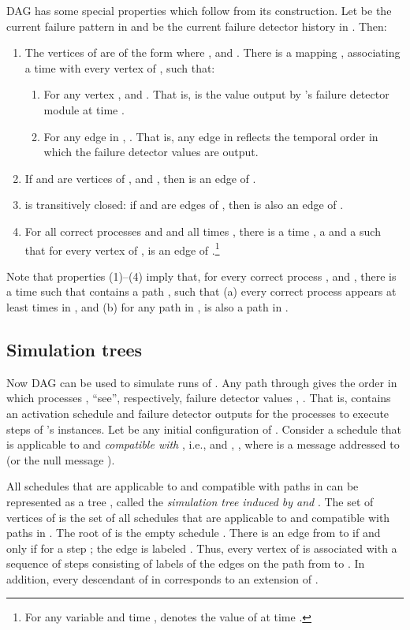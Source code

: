 \documentclass[11pt]{article}
\def\fd{failure detector}
\begin{document}
DAG  has some special properties which follow from its construction.
Let  be the current failure pattern in  and 
	be the current {\fd} history in .
Then: \begin{enumerate}
\item[(1)]  The vertices of  are of the form  where ,
 and .
There is a mapping ,
associating a time with every vertex of ,
such that:
\begin{enumerate}
\item[(a)] For any vertex ,  and .
That is,  is the value output by 's {\fd} module at time .

\item[(b)] For any edge  in , .
That is, any edge in  reflects the temporal order
	in which the {\fd} values are output.
\end{enumerate}
\item[(2)] If  and  are vertices of , and , then
 is an edge of .
\item[(3)]  is transitively closed: if  and  are edges of ,
	then  is also an edge of .
\item[(4)] For all correct processes  and  and all times ,
	there is a time , a  and a
	 such that for every  vertex  of ,
	 is an edge of .\footnote{
	For any variable  and time ,  denotes
	the value of  at time .}
\end{enumerate}


Note that properties (1)--(4) imply that, for every correct process ,  and ,
	there is a time  such that  contains a path
	, such that
	(a) every correct process appears at least  times in ,
	and (b) for any path  in ,  is also a path in .



\subsection{Simulation trees}
\label{subsec:cht:simulation}


Now DAG  can be used to simulate runs of .
Any path   
	through  gives the order in which
	processes ,   ``see'', respectively,
	{\fd} values ,  .
That is,  contains an activation schedule and {\fd}
	outputs for the processes to execute steps of
	's instances.
Let  be any initial configuration of .
Consider a schedule  that is applicable to 
	and \emph{compatible with },
	i.e.,  and , , where
	 is a message addressed to  (or the null message ).

All schedules that are applicable to  and compatible with paths in 
	can be represented as a tree , called the
	\emph{simulation tree induced by  and }.
The set of vertices of  is the set of all schedules  that are applicable to 
	and compatible with paths in .
The root of  is the empty schedule .
There is an edge from  to  if and only if  for a step ;
	the edge is labeled .
Thus, every vertex  of  is associated with a sequence
	of steps  consisting of labels of the edges
	on the path from  to .
In addition, every descendant of  in  corresponds to 	
	an extension of .
\end{document}
